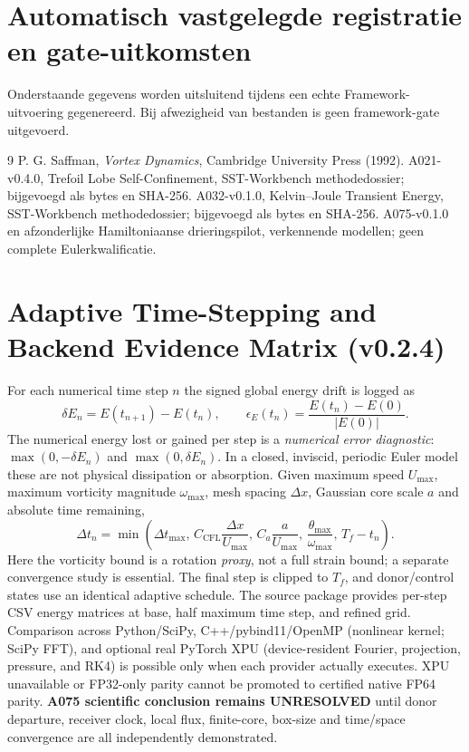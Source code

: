 \documentclass[10pt,a4paper]{article}
\begin{document}
\section{Automatisch vastgelegde registratie en gate-uitkomsten}
Onderstaande gegevens worden uitsluitend tijdens een echte Framework-uitvoering gegenereerd.
Bij afwezigheid van bestanden is geen framework-gate uitgevoerd.
\begin{thebibliography}{9}
 P. G. Saffman, \emph{Vortex Dynamics}, Cambridge University Press (1992).
 A021-v0.4.0, Trefoil Lobe Self-Confinement, SST-Workbench methodedossier; bijgevoegd als bytes en SHA-256.
 A032-v0.1.0, Kelvin--Joule Transient Energy, SST-Workbench methodedossier; bijgevoegd als bytes en SHA-256.
 A075-v0.1.0 en afzonderlijke Hamiltoniaanse drieringspilot, verkennende modellen; geen complete Eulerkwalificatie.
\end{thebibliography}

\section{Adaptive Time-Stepping and Backend Evidence Matrix (v0.2.4)}
For each numerical time step $n$ the signed global energy drift is logged as
\begin{equation}
\delta E_n=E(t_{n+1})-E(t_n),\qquad
\epsilon_E(t_n)=\frac{E(t_n)-E(0)}{|E(0)|}.
\end{equation}
The numerical energy lost or gained per step is a \emph{numerical error diagnostic}:
$\max(0,-\delta E_n)$ and $\max(0,\delta E_n)$. In a closed, inviscid,
periodic Euler model these are not physical dissipation or absorption.
Given maximum speed $U_{\max}$, maximum vorticity magnitude $\omega_{\max}$,
mesh spacing $\Delta x$, Gaussian core scale $a$ and absolute time remaining,
\begin{equation}
\Delta t_n=\min\left(\Delta t_{\max},\,
C_{\mathrm{CFL}}\frac{\Delta x}{U_{\max}},\,
C_a\frac{a}{U_{\max}},\,
\frac{\theta_{\max}}{\omega_{\max}},\,T_f-t_n\right).
\end{equation}
Here the vorticity bound is a rotation \emph{proxy}, not a full strain bound;
a separate convergence study is essential. The final step is clipped to $T_f$,
and donor/control states use an identical adaptive schedule.
The source package provides per-step CSV energy matrices at base,
half maximum time step, and refined grid. Comparison across Python/SciPy,
C++/pybind11/OpenMP (nonlinear kernel; SciPy FFT), and optional real
PyTorch XPU (device-resident Fourier, projection, pressure, and RK4) is
possible only when each provider actually executes. XPU unavailable or
FP32-only parity cannot be promoted to certified native FP64 parity.
\textbf{A075 scientific conclusion remains UNRESOLVED} until donor departure,
receiver clock, local flux, finite-core, box-size and time/space convergence
are all independently demonstrated.
\end{document}
